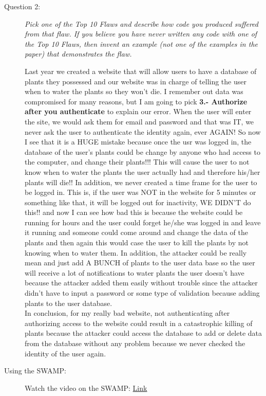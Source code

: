 \documentclass[12pt]{article}
\begin{document}
\begin{description}
\item[Question 2:]{\color{grey}\textit{Pick one of the Top 10 Flaws and describe how code you produced suffered from that flaw. If you believe you have never written any code with one of the Top 10 Flaws, then invent an example (not one of the examples in the paper) that demonstrates the flaw.}} \par
Last year we created a website that will allow users to have a database of plants they possessed and our website was in charge of telling the user when to water the plants so they won't die. I remember out data was compromised for many reasons, but I am going to pick \textbf{3.- Authorize after you authenticate } to explain our error. When the user will enter the site, we would ask them for email and password and that was IT, we never ask the user to authenticate the identity again, ever AGAIN! So now I see that it is a HUGE mistake because once the usr was logged in, the database of the user's plants could be change by anyone who had access to the computer, and change their plants!!! This will cause the user to not know when to water the plants the user actually had and therefore his/her plants will die!! In addition, we never created a time frame for the user to be logged in. This is, if the user was NOT in the website for 5 minutes or something like that, it will be logged out for inactivity, WE DIDN'T do this!! and now I can see how bad this is because the website could be running for hours and the user could forget he/she was logged in and leave it running and someone could come around and change the data of the plants and then again this would case the user to kill the plants by not knowing when to water them. In addition, the attacker could be really mean and just add A BUNCH of plants to the user data base so the user will receive a lot of notifications to water plants the user doesn't have because the attacker added them easily without trouble since the attacker didn't have to input a password or some type of validation because adding plants to the user database. \\
In conclusion, for my really bad website, not authenticating after authorizing access to the website could result in a catastrophic killing of plants because the attacker could access the database to add or delete data from the database without any problem because we never checked the identity of the user again. 

\item[Using the SWAMP:] Watch the video on the SWAMP: {\color{blue}\href{https://youtu.be/4nOXXNXxSBE}{Link}} \end{description}
\end{document}
